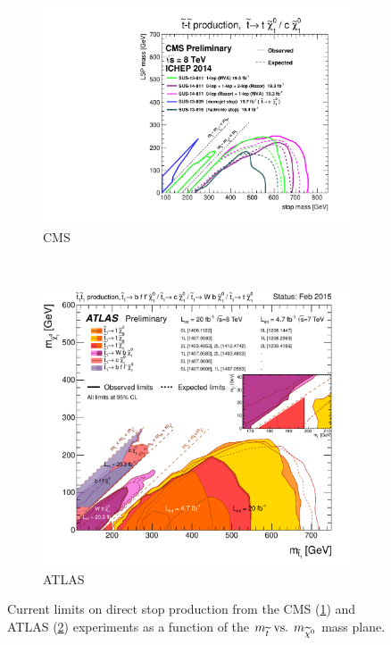 \begin{figure}[h!]
  \centering
  \begin{subfigure}[b]{0.65\textwidth}
    \includegraphics[width=\textwidth]{Figs/other_limits/T2tt_ICHEP2014_All.pdf}
    \caption{CMS}
    \label{fig:cms_current_limit}
  \end{subfigure}\\
  \begin{subfigure}[b]{0.65\textwidth}
    \includegraphics[width=\textwidth]{Figs/other_limits/ATLAS_SUSY_Stop_tLSP.pdf}
    \caption{ATLAS}
    \label{fig:atlas_current_limit}
  \end{subfigure}
  \caption{Current limits on direct stop production from the CMS
  (\ref{fig:cms_current_limit})\cite{cmssusyresults} and ATLAS
  (\ref{fig:atlas_current_limit})\cite{atlassusyresults}
  experiments as a function of the $m_{\widetilde{t}} \text{ vs. } m_{\widetilde{\chi}^{0}}$ mass
  plane.}
  \label{fig:current_limits}
\end{figure}

